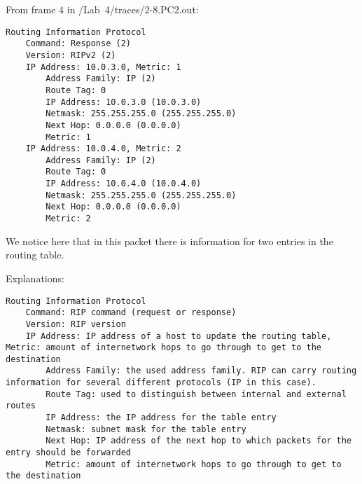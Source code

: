 From frame 4 in /Lab\ 4/traces/2-8.PC2.out: \\

\begin{lstlisting}
Routing Information Protocol
    Command: Response (2)
    Version: RIPv2 (2)
    IP Address: 10.0.3.0, Metric: 1
        Address Family: IP (2)
        Route Tag: 0
        IP Address: 10.0.3.0 (10.0.3.0)
        Netmask: 255.255.255.0 (255.255.255.0)
        Next Hop: 0.0.0.0 (0.0.0.0)
        Metric: 1
    IP Address: 10.0.4.0, Metric: 2
        Address Family: IP (2)
        Route Tag: 0
        IP Address: 10.0.4.0 (10.0.4.0)
        Netmask: 255.255.255.0 (255.255.255.0)
        Next Hop: 0.0.0.0 (0.0.0.0)
        Metric: 2
\end{lstlisting}
We notice here that in this packet there is information for two entries in the routing table.

Explanations:
\begin{lstlisting}
Routing Information Protocol
    Command: RIP command (request or response)
    Version: RIP version
    IP Address: IP address of a host to update the routing table, Metric: amount of internetwork hops to go through to get to the destination
        Address Family: the used address family. RIP can carry routing information for several different protocols (IP in this case).
        Route Tag: used to distinguish between internal and external routes
        IP Address: the IP address for the table entry
        Netmask: subnet mask for the table entry
        Next Hop: IP address of the next hop to which packets for the entry should be forwarded
        Metric: amount of internetwork hops to go through to get to the destination
\end{lstlisting}


